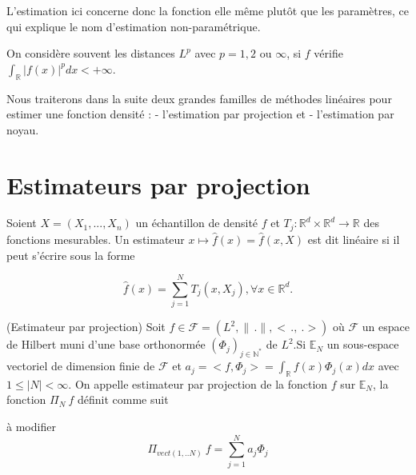 \documentclass[
]{book}
\begin{document}
L'estimation ici concerne donc la fonction elle même plutôt que les paramètres, ce qui explique le nom d'estimation non-paramétrique.\newline

\begin{rem}  
 On considère souvent les distances $L^p$ avec $p = 1,2$ ou $\infty$, si $f$ vérifie $\int_{\mathbb R} |f(x)|^p dx<+\infty$.
\end{rem}

\hspace*{0.5cm}

Nous traiterons dans la suite deux grandes familles de méthodes linéaires pour estimer une fonction densité : \newline
\hspace*{0.5cm} - l'estimation par projection et \newline
\hspace*{0.5cm} - l'estimation par noyau.

\hypertarget{estimateurs-par-projection}{%
\section{Estimateurs par projection}\label{estimateurs-par-projection}}

\begin{dfn}
Soient $X= (X_1,...,X_n)$ un échantillon de densité $f$ et $T_j : \mathbb{R}^d \times \mathbb{R}^d \rightarrow \mathbb{R}$ des fonctions mesurables.  
Un estimateur $x \mapsto \hat{f}(x) = \hat{f}(x,X)$ est dit linéaire si il peut s'écrire sous la forme

$$
\hat{f}(x) = \sum^N_{j=1}T_j(x,X_j), \forall x \in \mathbb{R}^d.
$$

\end{dfn}

\begin{dfn}
(Estimateur par projection) \newline
Soit $f \in \mathcal F = (L^2 , \parallel\,.\parallel, <\,.,~.>)$ où $\mathcal{F} $ un espace de Hilbert muni d'une base orthonormée $(\Phi_j)_{j \in \mathbb{N^*}}$ de $L^2$.Si $\mathbb E _N$  un sous-espace vectoriel de dimension finie de $\mathcal F$ et $a_j = <f,\Phi_j> = \int_{\mathbb R}f(x)\Phi_j(x) dx$ avec $1 \leq |N| < \infty$.\newline
On appelle estimateur par projection de la fonction $f$ sur $\mathbb E_N$, la fonction $\Pi_N~f$ définit comme suit 

à modifier
$$
\Pi_{vect(1,..N)}~f = \sum_{j=1}^N a_j \Phi_j
$$
\end{dfn}
\end{document}
